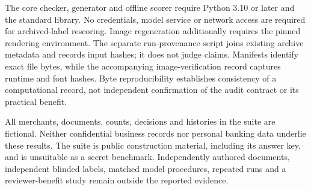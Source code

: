 The core checker, generator and offline scorer require Python 3.10 or later and the standard library. No credentials, model service or network access are required for archived-label rescoring. Image regeneration additionally requires the pinned rendering environment. The separate run-provenance script joins existing archive metadata and records input hashes; it does not judge claims. Manifests identify exact file bytes, while the accompanying image-verification record captures runtime and font hashes. Byte reproducibility establishes consistency of a computational record, not independent confirmation of the audit contract or its practical benefit.

All merchants, documents, counts, decisions and histories in the suite are fictional. Neither confidential business records nor personal banking data underlie these results. The suite is public construction material, including its answer key, and is unsuitable as a secret benchmark. Independently authored documents, independent blinded labels, matched model procedures, repeated runs and a reviewer-benefit study remain outside the reported evidence.
